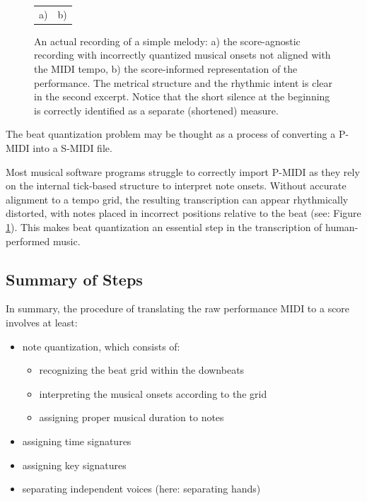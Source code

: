 \begin{figure}[ht!]
\centering
\begin{tabular}{cc}a)

 & b)
\end{tabular}
\caption[An actual recording of a simple melody.]{An actual recording of a simple melody: a) the score-agnostic recording with incorrectly quantized musical onsets not aligned with the MIDI tempo, b) the score-informed representation of the performance. The metrical structure and the rhythmic intent is clear in the second excerpt. Notice that the short silence at the beginning is correctly identified as a separate (shortened) measure.}
\label{score_informed}
\end{figure}

The beat quantization problem may be thought as a process of converting a P-MIDI into a S-MIDI file.

Most musical software programs struggle to correctly import P-MIDI as they rely on the internal tick-based structure to interpret note onsets. Without accurate alignment to a tempo grid, the resulting transcription can appear rhythmically distorted, with notes placed in incorrect positions relative to the beat (see: Figure \ref{score_informed}). This makes beat quantization an essential step in the transcription of human-performed music.

\subsection{Summary of Steps}

In summary, the procedure of translating the raw performance MIDI to a score involves at least: \begin{itemize}
	\item note quantization, which consists of:
	\begin{itemize}
		\item recognizing the beat grid within the downbeats
		\item interpreting the musical onsets according to the grid
		\item assigning proper musical duration to notes	
	\end{itemize}
	\item assigning time signatures
	\item assigning key signatures
	\item separating independent voices (here: separating hands)
\end{itemize}

